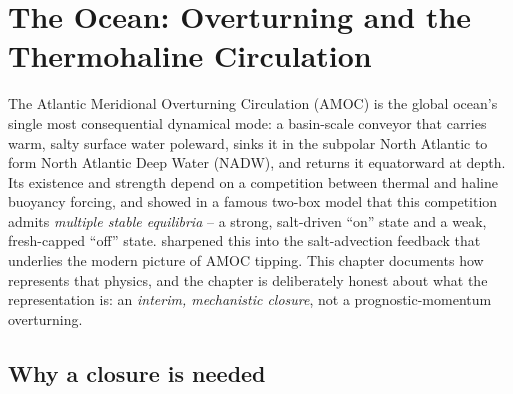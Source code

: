 \chapter{The Ocean: Overturning and the Thermohaline Circulation}
\label{chap:ch08_ocean_overturning}

\providecommand{\vthc}{\vv_{\mathrm{thc}}}          %
\providecommand{\kvel}{k_{\mathrm{vel}}}            %
\providecommand{\drho}{\Delta\dens}                 %
\providecommand{\dS}{\Delta\Salt}                   %
\providecommand{\hgain}{\gamma_{\mathrm{S}}}        %
\providecommand{\bS}{\beta_{\mathrm{S}}}            %

The Atlantic Meridional Overturning Circulation (AMOC) is the global ocean's
single most consequential dynamical mode: a basin-scale conveyor that carries
warm, salty surface water poleward, sinks it in the subpolar North Atlantic to
form North Atlantic Deep Water (NADW), and returns it equatorward at depth.
Its existence and strength depend on a competition between thermal and haline
buoyancy forcing, and \citet{stommel1961} showed in a famous two-box model that
this competition admits \emph{multiple stable equilibria} -- a strong, salt-driven
``on'' state and a weak, fresh-capped ``off'' state. \citet{marotzke1991}
sharpened this into the salt-advection feedback that underlies the modern picture
of AMOC tipping. This chapter documents how \model{} represents that physics, and
the chapter is deliberately honest about what the representation is: an
\emph{interim, mechanistic closure}, not a prognostic-momentum overturning.

\section{Why a closure is needed}

